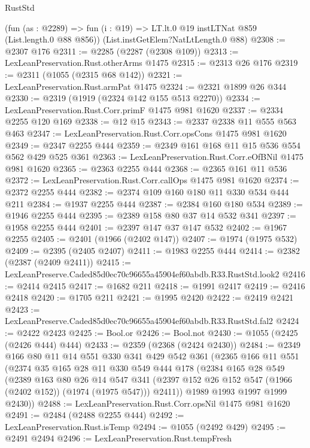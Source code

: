\begin{lexlean}{RustStd}
\begin{coremodule}
    (fun (as : @2289) => fun (i : @19) => LT.lt.{0} @19 instLTNat @859 (List.length.{0} @88 @856))
    (List.instGetElem?NatLtLength.{0} @88)
@2308 := @2307 @176
@2311 := @2285 (@2287 (@2308 @109))
@2313 := LexLeanPreservation.Rust.otherArms @1475
@2315 := @2313 @26 @176
@2319 := @2311 (@1055 (@2315 @68 @142))
@2321 := LexLeanPreservation.Rust.armPat @1475
@2324 := @2321 @1899 @26 @344
@2330 := @2319 (@1919 (@2324 @142 @155 @513 @2270))
@2334 := LexLeanPreservation.Rust.Corr.primF @1475 @981 @1620
@2337 := @2334 @2255 @120 @169
@2338 := @12 @15
@2343 := @2337 @2338 @11 @555 @563 @463
@2347 := LexLeanPreservation.Rust.Corr.opsCons @1475 @981 @1620
@2349 := @2347 @2255 @444
@2359 := @2349 @161 @168 @11 @15 @536 @554 @562 @429 @525 @361
@2363 := LexLeanPreservation.Rust.Corr.eOfBNil @1475 @981 @1620
@2365 := @2363 @2255 @444
@2368 := @2365 @161 @11 @536
@2372 := LexLeanPreservation.Rust.Corr.callOps @1475 @981 @1620
@2374 := @2372 @2255 @444
@2382 := @2374 @109 @160 @180 @11 @330 @534 @444 @211
@2384 := @1937 @2255 @444
@2387 := @2384 @160 @180 @534
@2389 := @1946 @2255 @444
@2395 := @2389 @158 @80 @37 @14 @532 @341
@2397 := @1958 @2255 @444
@2401 := @2397 @147 @37 @147 @532
@2402 := @1967 @2255
@2405 := @2401 (@1966 (@2402 @147))
@2407 := @1974 (@1975 @532)
@2409 := @2395 (@2405 @2407)
@2411 := @1983 @2255 @444
@2414 := @2382 (@2387 (@2409 @2411))
@2415 := LexLeanPreserve.Caded85d0ec70c96655a45904ef60abdb.R33.RustStd.look2
@2416 := @2414 @2415
@2417 := @1682 @211
@2418 := @1991 @2417
@2419 := @2416 @2418
@2420 := @1705 @211
@2421 := @1995 @2420
@2422 := @2419 @2421
@2423 := LexLeanPreserve.Caded85d0ec70c96655a45904ef60abdb.R33.RustStd.fal2
@2424 := @2422 @2423
@2425 := Bool.or
@2426 := Bool.not
@2430 := @1055 (@2425 (@2426 @444) @444)
@2433 := @2359 (@2368 (@2424 @2430))
@2484 := @2349
    @166
    @80
    @11
    @14
    @551
    @330
    @341
    @429
    @542
    @361
    (@2365
      @166
      @11
      @551
      (@2374
        @35
        @165
        @28
        @11
        @330
        @549
        @444
        @178
        (@2384
          @165
          @28
          @549
          (@2389
            @163
            @80
            @26
            @14
            @547
            @341
            (@2397 @152 @26 @152 @547 (@1966 (@2402 @152)) (@1974 (@1975 @547)))
            @2411))
        @1989
        @1993
        @1997
        @1999
        @2430))
@2488 := LexLeanPreservation.Rust.Corr.opsNil @1475 @981 @1620
@2491 := @2484 (@2488 @2255 @444)
@2492 := LexLeanPreservation.Rust.isTemp
@2494 := @1055 (@2492 @429)
@2495 := @2491 @2494
@2496 := LexLeanPreservation.Rust.tempFresh

\end{coremodule}
\end{lexlean}
